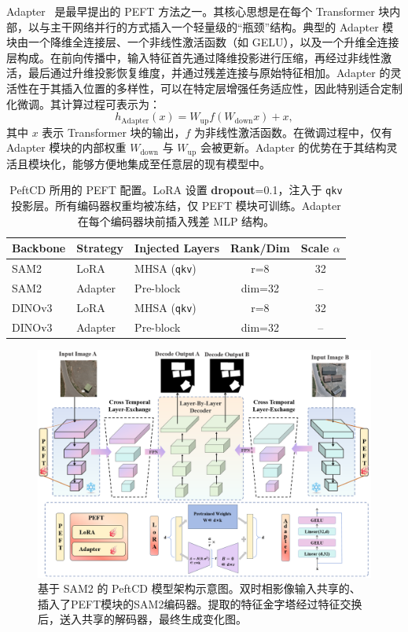 Adapter~\cite{adapter} 是最早提出的 PEFT 方法之一。其核心思想是在每个 Transformer 块内部，以与主干网络并行的方式插入一个轻量级的“瓶颈”结构。典型的 Adapter 模块由一个降维全连接层、一个非线性激活函数（如 GELU），以及一个升维全连接层构成。在前向传播中，输入特征首先通过降维投影进行压缩，再经过非线性激活，最后通过升维投影恢复维度，并通过残差连接与原始特征相加。Adapter 的灵活性在于其插入位置的多样性，可以在特定层增强任务适应性，因此特别适合定制化微调。其计算过程可表示为：
\begin{equation}
    h_{\text{Adapter}}(x) = W_{\text{up}} f(W_{\text{down}} x) + x,
    \label{eq:adapter}
\end{equation}
其中 $x$ 表示 Transformer 块的输出，$f$ 为非线性激活函数。在微调过程中，仅有 Adapter 模块的内部权重 $W_{\text{down}}$ 与 $W_{\text{up}}$ 会被更新。Adapter 的优势在于其结构灵活且模块化，能够方便地集成至任意层的现有模型中。


\begin{table}[!htbp]
\centering
\caption{PeftCD 所用的 PEFT 配置。LoRA 设置 \textbf{dropout}=0.1，注入于 \texttt{qkv} 投影层。所有编码器权重均被冻结，仅 PEFT 模块可训练。Adapter 在每个编码器块前插入残差 MLP 结构。}
\label{tab:peftcd_cfg}
\begin{tabular}{l l l c c}
\toprule
\textbf{Backbone} & \textbf{Strategy} & \textbf{Injected Layers} & \textbf{Rank/Dim} & \textbf{Scale $\alpha$} \\
\midrule
SAM2   & LoRA    & MHSA (\texttt{qkv})    & r=8   & 32 \\
SAM2   & Adapter & Pre-block    & dim=32 & -- \\
DINOv3 & LoRA    & MHSA (\texttt{qkv})     & r=8   & 32 \\
DINOv3 & Adapter & Pre-block     & dim=32 & -- \\
\bottomrule
\end{tabular}
\end{table}

\begin{figure}[!htbp]
  \centering
  \includegraphics[width=\textwidth]{paper_figures/基于AI基础模型微调的变化检测模型研究/PeftCD/peftcd_sam2cd.png}
  \caption{基于 SAM2 的 PeftCD 模型架构示意图。双时相影像输入共享的、插入了PEFT模块的SAM2编码器。提取的特征金字塔经过特征交换后，送入共享的解码器，最终生成变化图。}
  \label{fig:peftcd_sam2cd}
\end{figure}


